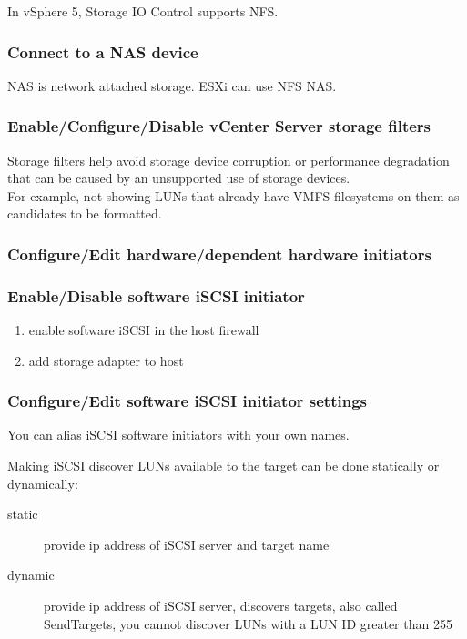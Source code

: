 In vSphere 5, Storage IO Control supports NFS.

\subsubsection{Connect to a NAS device}

NAS is network attached storage. ESXi can use NFS NAS.

\subsubsection{Enable/Configure/Disable vCenter Server storage filters}

Storage filters help avoid storage device corruption or performance
degradation that can be caused by an unsupported use of storage devices.\\

For example, not showing LUNs that already have VMFS filesystems on them
as candidates to be formatted.

\subsubsection{Configure/Edit hardware/dependent hardware initiators}

\subsubsection{Enable/Disable software iSCSI initiator}

\begin{enumerate}
\item enable software iSCSI in the host firewall
\item add storage adapter to host
\end{enumerate}

\subsubsection{Configure/Edit software iSCSI initiator settings}

You can alias iSCSI software initiators with your own names.

Making iSCSI discover LUNs available to the target can be done statically
or dynamically:

\begin{description}

\item[static]
provide ip address of iSCSI server and target name

\item[dynamic]
provide ip address of iSCSI server, discovers targets, also called SendTargets,
you cannot discover LUNs with a LUN ID greater than 255

\end{description}


